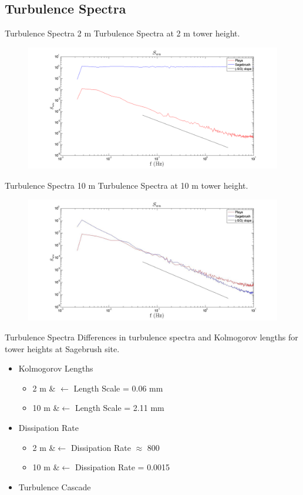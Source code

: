 \documentclass{beamer}
\begin{document}
\subsection{Turbulence Spectra}
\begin{frame}{Turbulence Spectra 2 m}
Turbulence Spectra at 2 m tower height.
\begin{figure}
\centering
\includegraphics[width=\linewidth]{plots/S_uu.png}
\end{figure}
\end{frame}

\begin{frame}{Turbulence Spectra 10 m}
Turbulence Spectra at 10 m tower height.
\begin{figure}
\centering
\includegraphics[width=\linewidth]{plots/S_uu10m.jpg}
\end{figure}
\end{frame}

\begin{frame}{Turbulence Spectra}
Differences in turbulence spectra and Kolmogorov lengths for tower heights at Sagebrush site.
\begin{itemize}
\item{Kolmogorov Lengths}
	\begin{itemize}
	\item{2 m & $\leftarrow$ Length Scale = 0.06 mm}
	\item{10 m &$\leftarrow$ Length Scale = 2.11 mm}
	\end{itemize}
\item{Dissipation Rate}
	\begin{itemize}
	\item{2 m &$\leftarrow$ Dissipation Rate $\approx$ 800}
	\item{10 m &$\leftarrow$ Dissipation Rate = 0.0015}
	\end{itemize}
\item{Turbulence Cascade} 
\end{itemize}
\end{frame}
\end{document}
